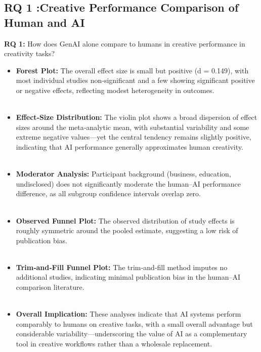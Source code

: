 \documentclass[acmsmall,authorversion]{acmart}
\begin{document}
\subsection{RQ 1 :Creative Performance Comparison of Human and AI}
\label{sec:CreativePerformanceComparisonOfHumanAndAI}
\textbf{RQ 1:} How does GenAI alone compare to humans in creative performance in creativity tasks? \\

\begin{itemize}
  \item \textbf{Forest Plot:} The overall effect size is small but positive (d = 0.149), with most individual studies non‐significant and a few showing significant positive or negative effects, reflecting modest heterogeneity in outcomes.
  \\ \\
  \item \textbf{Effect‐Size Distribution:} The violin plot shows a broad dispersion of effect sizes around the meta‐analytic mean, with substantial variability and some extreme negative values—yet the central tendency remains slightly positive, indicating that AI performance generally approximates human creativity.
  \\ \\
  \item \textbf{Moderator Analysis:} Participant background (business, education, undisclosed) does not significantly moderate the human–AI performance difference, as all subgroup confidence intervals overlap zero.
  \\ \\
  \item \textbf{Observed Funnel Plot:} The observed distribution of study effects is roughly symmetric around the pooled estimate, suggesting a low risk of publication bias.
  \\ \\
  \item \textbf{Trim‐and‐Fill Funnel Plot:} The trim‐and‐fill method imputes no additional studies, indicating minimal publication bias in the human–AI comparison literature.
  \\ \\
  \item \textbf{Overall Implication:} These analyses indicate that AI systems perform comparably to humans on creative tasks, with a small overall advantage but considerable variability—underscoring the value of AI as a complementary tool in creative workflows rather than a wholesale replacement.
\end{itemize}
\end{document}

